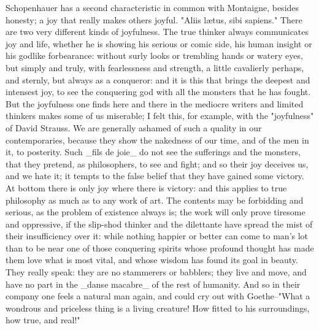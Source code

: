 Schopenhauer has a second characteristic in common with Montaigne,
besides honesty; a joy that really makes others joyful. "Aliis lætus,
sibi sapiens." There are two very different kinds of joyfulness. The
true thinker always communicates joy and life, whether he is showing
his serious or comic side, his human insight or his godlike
forbearance: without surly looks or trembling hands or watery eyes,
but simply and truly, with fearlessness and strength, a little
cavalierly perhaps, and sternly, but always as a conqueror: and it is
this that brings the deepest and intensest joy, to see the conquering
god with all the monsters that he has fought. But the joyfulness one
finds here and there in the mediocre writers and limited thinkers
makes some of us miserable; I felt this, for example, with the
"joyfulness" of David Strauss. We are generally ashamed of such a
quality in our contemporaries, because they show the nakedness of our
time, and of the men in it, to posterity. Such _fils de joie_ do not
see the sufferings and the monsters, that they pretend, as
philosophers, to see and fight; and so their joy deceives us, and we
hate it; it tempts to the false belief that they have gained some
victory. At bottom there is only joy where there is victory: and this
applies to true philosophy as much as to any work of art. The
contents may be forbidding and serious, as the problem of existence
always is; the work will only prove tiresome and oppressive, if the
slip-shod thinker and the dilettante have spread the mist of their
insufficiency over it: while nothing happier or better can come to
man's lot than to be near one of those conquering spirits whose
profound thought has made them love what is most vital, and whose
wisdom has found its goal in beauty. They really speak: they are no
stammerers or babblers; they live and move, and have no part in the
_danse macabre_ of the rest of humanity. And so in their company one
feels a natural man again, and could cry out with Goethe--"What a
wondrous and priceless thing is a living creature! How fitted to his
surroundings, how true, and real!"

